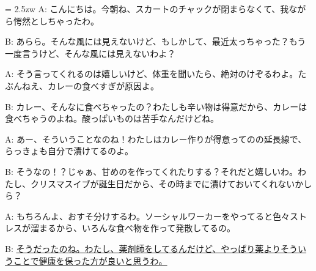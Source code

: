 \documentclass[11pt]{amsart}
\title{}
\author{}
\newenvironment{hangall}[1]{\hangindent = 2.5zw\everypar{\hangindent = 2.5zw}}{}
\begin{document}
\maketitle
\begin{hangall}{}%
A: こんにちは。今朝ね、スカートのチャックが閉まらなくて、我ながら愕然としちゃったわ。

B: あらら。そんな風には見えないけど、もしかして、最近太っちゃった？もう一度言うけど、そんな風には見えないわよ？

A: そう言ってくれるのは嬉しいけど、体重を聞いたら、絶対のけぞるわよ。たぶんねえ、カレーの食べすぎが原因よ。

B: カレー、そんなに食べちゃったの？わたしも辛い物は得意だから、カレーは食べちゃうのよね。酸っぱいものは苦手なんだけどね。

A: あー、そういうことなのね！わたしはカレー作りが得意ってのの延長線で、らっきょも自分で漬けてるのよ。

B: そうなの！？じゃぁ、甘めのを作ってくれたりする？それだと嬉しいわ。わたし、クリスマスイブが誕生日だから、その時までに漬けておいてくれないかしら？

A: もちろんよ、おすそ分けするわ。ソーシャルワーカーをやってると色々ストレスが溜まるから、いろんな食べ物を作って発散してるの。

B: \ul{そうだったのね。わたし、薬剤師をしてるんだけど、やっぱり薬よりそういうことで健康を保った方が良いと思うわ。}\end{hangall}
\end{document}
